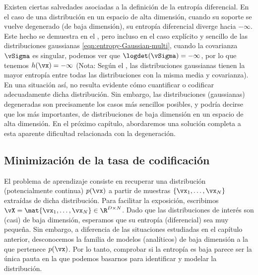 \documentclass[../../book-main.tex]{subfiles}
\begin{document}
Existen ciertas salvedades asociadas a la definición
de la entropía diferencial. En el caso de una distribución en un espacio de alta dimensión,
cuando su soporte se vuelve degenerado (de baja dimensión), su
entropía diferencial diverge hacia \(-\infty\). Este hecho se demuestra en el
, pero incluso en el caso explícito y sencillo de las
distribuciones gaussianas \eqref{eqn:entropy-Gaussian-multi}, cuando la
covarianza \(\vSigma\) es singular, podemos ver que
\(\logdet(\vSigma) = -\infty\), por lo que tenemos \(h(\vx) = -\infty\)
(Nota:
    Según el , las distribuciones gaussianas tienen la
mayor entropía entre todas las distribuciones con la misma media y covarianza). En
una situación así, no resulta evidente cómo cuantificar o
codificar adecuadamente dicha distribución. Sin embargo, las distribuciones (gaussianas)
degeneradas son precisamente los casos más sencillos posibles, y podría decirse que los
más importantes, de distribuciones de baja dimensión en un espacio de alta dimensión.
En el próximo capítulo, abordaremos una solución completa
a esta aparente dificultad relacionada con la degeneración.

\subsection{Minimización de la tasa de codificación}
\label{sub:min_entropy}
El problema de aprendizaje consiste en recuperar una distribución (potencialmente continua)
\(p(\vx)\) a partir de muestras \(\{\vx_{1}, \dots, \vx_{N}\}\)
extraídas de dicha distribución. Para facilitar la exposición, escribimos \(\vX = \mat{\vx_{1},
\dots, \vx_{N}} \in \R^{D \times N}\). Dado que las distribuciones de
interés son (casi) de baja dimensión, esperamos que su entropía (diferencial)
sea muy pequeña. Sin embargo, a diferencia de las situaciones estudiadas en
el capítulo anterior, desconocemos la familia de modelos (analíticos)
de baja dimensión a la que pertenece \(p(\vx)\). Por lo tanto, comprobar
si la entropía es baja parece ser la única pauta en la que podemos
basarnos para identificar y modelar la distribución.
\end{document}
